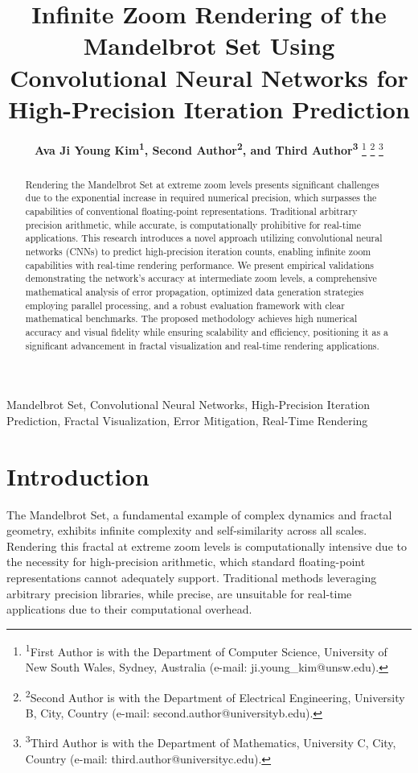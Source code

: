 \documentclass[journal]{IEEEaccess}
\begin{document}
\title{Infinite Zoom Rendering of the Mandelbrot Set Using Convolutional Neural Networks for High-Precision Iteration Prediction}

\author{%
\textbf{Ava Ji Young Kim\textsuperscript{1}, Second Author\textsuperscript{2}, and Third Author\textsuperscript{3}}
\thanks{\textsuperscript{1}First Author is with the Department of Computer Science, University of New South Wales, Sydney, Australia (e-mail: ji.young_kim@unsw.edu).}
\thanks{\textsuperscript{2}Second Author is with the Department of Electrical Engineering, University B, City, Country (e-mail: second.author@universityb.edu).}
\thanks{\textsuperscript{3}Third Author is with the Department of Mathematics, University C, City, Country (e-mail: third.author@universityc.edu).}
}

\maketitle

\begin{abstract}
Rendering the Mandelbrot Set at extreme zoom levels presents significant challenges due to the exponential increase in required numerical precision, which surpasses the capabilities of conventional floating-point representations. Traditional arbitrary precision arithmetic, while accurate, is computationally prohibitive for real-time applications. This research introduces a novel approach utilizing convolutional neural networks (CNNs) to predict high-precision iteration counts, enabling infinite zoom capabilities with real-time rendering performance. We present empirical validations demonstrating the network's accuracy at intermediate zoom levels, a comprehensive mathematical analysis of error propagation, optimized data generation strategies employing parallel processing, and a robust evaluation framework with clear mathematical benchmarks. The proposed methodology achieves high numerical accuracy and visual fidelity while ensuring scalability and efficiency, positioning it as a significant advancement in fractal visualization and real-time rendering applications.
\end{abstract}

\begin{keywords}
Mandelbrot Set, Convolutional Neural Networks, High-Precision Iteration Prediction, Fractal Visualization, Error Mitigation, Real-Time Rendering
\end{keywords}

\section{Introduction}
\label{sec:introduction}
The Mandelbrot Set, a fundamental example of complex dynamics and fractal geometry, exhibits infinite complexity and self-similarity across all scales. Rendering this fractal at extreme zoom levels is computationally intensive due to the necessity for high-precision arithmetic, which standard floating-point representations cannot adequately support. Traditional methods leveraging arbitrary precision libraries, while precise, are unsuitable for real-time applications due to their computational overhead.
\end{document}
